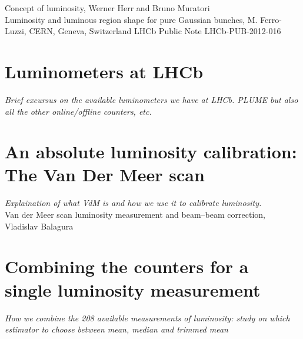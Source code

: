 Concept of luminosity,  Werner Herr and Bruno Muratori\\
Luminosity and luminous region shape for pure Gaussian bunches, M. Ferro-Luzzi, CERN, Geneva, Switzerland LHCb Public Note LHCb-PUB-2012-016

\section{Luminometers at LHCb}
\textit{Brief excursus on the available luminometers we have at LHCb. PLUME but also all the other online/offline counters, etc.}
\section{An absolute luminosity calibration: The Van Der Meer scan}
\textit{Explaination of what VdM is and how we use it to calibrate luminosity.}\\
Van der Meer scan luminosity measurement and beam–beam correction, Vladislav Balagura

\section{Combining the counters for a single luminosity measurement}
\textit{How we combine the 208 available measurements of luminosity: study on which estimator to choose between mean, median and trimmed mean}